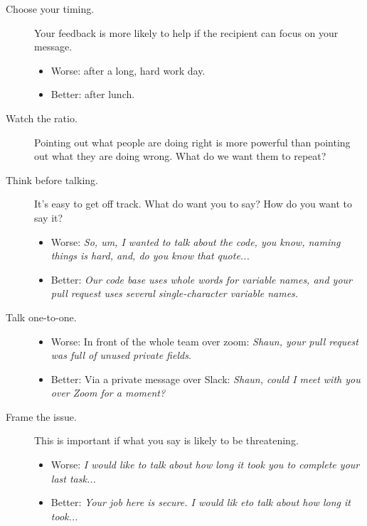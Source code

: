 \documentclass{article}
\begin{document}
\begin{tiny}
\begin{multicols}{3}
\begin{tcolorbox}
        \begin{description}
            \item[Choose your timing.] Your feedback is more likely to help if the recipient can focus on your message.
                \begin{itemize}
                    \item Worse: after a long, hard work day.
                    \item Better: after lunch.
                \end{itemize}
            \item[Watch the ratio.] Pointing out what people are doing right is more powerful than pointing out what they are doing wrong. What do we want them to repeat?
            \item[Think before talking.] It's easy to get off track. What do want you to say? How do you want to say it?
                \begin{itemize}
                    \item Worse: \emph{So, um, I wanted to talk about the code, you know, naming things is hard, and, do you know that quote...}                    
                    \item Better: \emph{Our code base uses whole words for variable names, and your pull request uses several single-character variable names.}
                \end{itemize}
            \item[Talk one-to-one.] 
                \begin{itemize}
                    \item Worse: In front of the whole team over zoom: \emph{Shaun, your pull request was full of unused private fields}.
                    \item Better: Via a private message over Slack: \emph{Shaun, could I meet with you over Zoom for a moment?}
                \end{itemize}
            \item[Frame the issue.] This is important if what you say is likely to be threatening.
                \begin{itemize}
                   \item Worse: \emph{I would like to talk about how long it took you to complete your last task... }
                   \item Better: \emph{Your job here is secure. I would lik eto talk about how long it took... }
                \end{itemize}

\end{description}
\end{tcolorbox}
\end{multicols}
\end{tiny}
\end{document}
